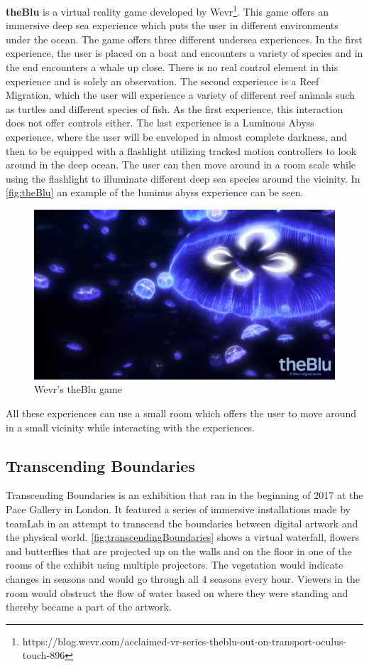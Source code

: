 \textbf{theBlu} is a virtual reality game developed by Wevr\footnote{https://blog.wevr.com/acclaimed-vr-series-theblu-out-on-transport-oculus-touch-896}. This game offers an immersive deep sea experience which puts the user in different environments under the ocean. The game offers three different undersea experiences. In the first experience, the user is placed on a boat and encounters a variety of species and in the end encounters a whale up close. There is no real control element in this experience and is solely an observation. The second experience is a Reef Migration, which the user will experience a variety of different reef animals such as turtles and different species of fish. As the first experience, this interaction does not offer controls either. The last experience is a Luminous Abyss experience, where the user will be enveloped in almost complete darkness, and then to be equipped with a flashlight utilizing tracked motion controllers to look around in the deep ocean. The user can then move around in a room scale while using the flashlight to illuminate different deep sea species around the vicinity. In \autoref{fig:theBlu} an example of the luminus abyss experience can be seen.
    \begin{figure}[H]
    	\centering
    	\includegraphics[width=0.9\linewidth]{figure/Analysis/theblu.png}
    	\caption{Wevr's theBlu game}
    	\label{fig:theBlu}
    \end{figure}
All these experiences can use a small room which offers the user to move around in a small vicinity while interacting with the experiences. 

\subsection{Transcending Boundaries}\label{sec:transcendingBoundaries} %
Transcending Boundaries is an exhibition that ran in the beginning of 2017 at the Pace Gallery in London. It featured a series of immersive installations made by teamLab in an attempt to transcend the boundaries between digital artwork and the physical world\cite{transcendingBoundries}. \autoref{fig:transcendingBoundaries} shows a virtual waterfall, flowers and butterflies that are projected up on the walls and on the floor in one of the rooms of the exhibit using multiple projectors. The vegetation would indicate changes in seasons and would go through all 4 seasons every hour. Viewers in the room would obstruct the flow of water based on where they were standing and thereby became a part of the artwork. 

